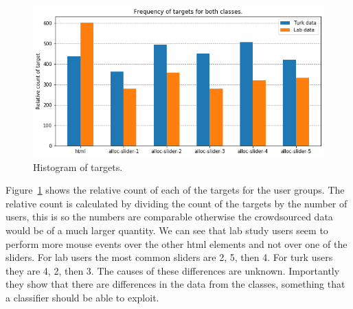 \documentclass{article}
\begin{document}
\begin{figure}[ht]
    \centering
    \includegraphics[scale=0.6]{Images/1-grams.png}
    \caption{Histogram of targets.}
    \label{fig:1-grams}
\end{figure}

Figure~\ref{fig:1-grams} shows the relative count of each of the targets for the user groups.
The relative count is calculated by dividing the count of the targets by the number of users, this is so the numbers are comparable otherwise the crowdsourced data would be of a much larger quantity.
We can see that lab study users seem to perform more mouse events over the other html elements and not over one of the sliders.
For lab users the most common sliders are 2, 5, then 4.
For turk users they are 4, 2, then 3.
The causes of these differences are unknown.
Importantly they show that there are differences in the data from the classes, something that a classifier should be able to exploit.


\end{document}
